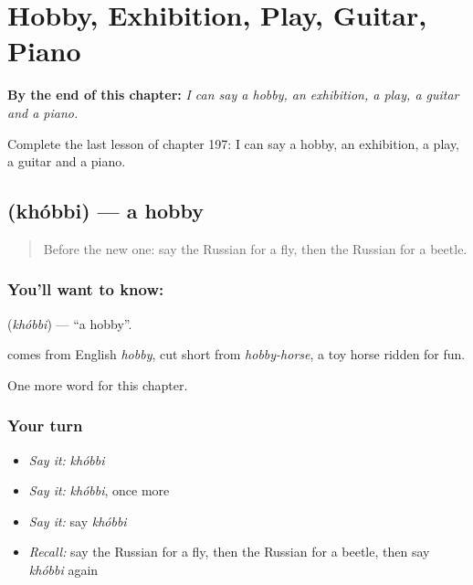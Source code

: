 
\chapter{Hobby, Exhibition, Play, Guitar, Piano}
\label{ch:ru-hobby-exhibition-play-guitar-piano}

\begin{chapteropening}
\textbf{By the end of this chapter:} \emph{I can say a hobby, an exhibition, a play, a guitar and a piano.}

Complete the last lesson of chapter 197: I can say a hobby, an exhibition, a play, a guitar and a piano.
\end{chapteropening}

\section[\texorpdfstring{\ru{хобби} (khóbbi)}{хобби (khóbbi)}]{ (khóbbi) — a hobby}

\label{lesson:RU-C197-khobbi}



\begin{quote}
Before the new one: say the Russian for a fly, then the Russian for a beetle.
\end{quote}

\subsection*{You'll want to know: }
\textbf{} (\emph{khóbbi}) — \textquotedblleft{}a hobby\textquotedblright{}.

\begin{cousinweb}
\textbf{} comes from English \emph{hobby}, cut short from \emph{hobby-horse}, a toy horse ridden for fun.
\end{cousinweb}

\begin{grammarlens}[title={What you've built}]
One more word for this chapter.
\end{grammarlens}

\subsection*{Your turn}
\begin{itemize}
\raggedright
  \item \emph{Say it:} \emph{khóbbi}
  \item \emph{Say it:} \emph{khóbbi}, once more
  \item \emph{Say it:} say \emph{khóbbi}
  \item \emph{Recall:} say the Russian for a fly, then the Russian for a beetle, then say \emph{khóbbi} again
\end{itemize}


